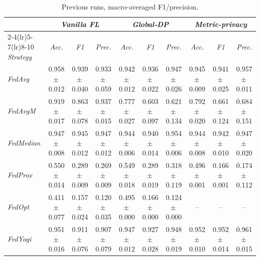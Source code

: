 \documentclass[11pt]{article}
\begin{document}
\begin{table}[h]
\centering
\caption{Previous runs, macro-averaged F1/precision.}
\begin{tabular}{l ccc ccc ccc}
\toprule
& \multicolumn{3}{c}{\emph{Vanilla FL}} & \multicolumn{3}{c}{\emph{Global-DP}} & \multicolumn{3}{c}{\emph{Metric-privacy}} \\
\cmidrule(lr){2-4}\cmidrule(lr){5-7}\cmidrule(lr){8-10}
\emph{Strategy} & \emph{Acc.} & \emph{F1} & \emph{Prec.} & \emph{Acc.} & \emph{F1} & \emph{Prec.} & \emph{Acc.} & \emph{F1} & \emph{Prec.} \\
\midrule
\emph{FedAvg} & 0.958 {\scriptsize$\pm$\,0.012} & 0.939 {\scriptsize$\pm$\,0.040} & 0.933 {\scriptsize$\pm$\,0.059} & 0.942 {\scriptsize$\pm$\,0.012} & 0.936 {\scriptsize$\pm$\,0.022} & 0.947 {\scriptsize$\pm$\,0.026} & 0.945 {\scriptsize$\pm$\,0.009} & 0.941 {\scriptsize$\pm$\,0.025} & 0.957 {\scriptsize$\pm$\,0.011} \\
\emph{FedAvgM} & 0.919 {\scriptsize$\pm$\,0.017} & 0.863 {\scriptsize$\pm$\,0.078} & 0.937 {\scriptsize$\pm$\,0.015} & 0.777 {\scriptsize$\pm$\,0.027} & 0.603 {\scriptsize$\pm$\,0.097} & 0.621 {\scriptsize$\pm$\,0.134} & 0.792 {\scriptsize$\pm$\,0.020} & 0.661 {\scriptsize$\pm$\,0.124} & 0.684 {\scriptsize$\pm$\,0.151} \\
\emph{FedMedian} & 0.947 {\scriptsize$\pm$\,0.008} & 0.945 {\scriptsize$\pm$\,0.012} & 0.947 {\scriptsize$\pm$\,0.012} & 0.944 {\scriptsize$\pm$\,0.006} & 0.940 {\scriptsize$\pm$\,0.014} & 0.954 {\scriptsize$\pm$\,0.006} & 0.944 {\scriptsize$\pm$\,0.008} & 0.942 {\scriptsize$\pm$\,0.010} & 0.947 {\scriptsize$\pm$\,0.020} \\
\emph{FedProx} & 0.550 {\scriptsize$\pm$\,0.014} & 0.289 {\scriptsize$\pm$\,0.009} & 0.269 {\scriptsize$\pm$\,0.009} & 0.549 {\scriptsize$\pm$\,0.018} & 0.289 {\scriptsize$\pm$\,0.019} & 0.318 {\scriptsize$\pm$\,0.119} & 0.496 {\scriptsize$\pm$\,0.001} & 0.166 {\scriptsize$\pm$\,0.001} & 0.174 {\scriptsize$\pm$\,0.112} \\
\emph{FedOpt} & 0.411 {\scriptsize$\pm$\,0.077} & 0.157 {\scriptsize$\pm$\,0.024} & 0.120 {\scriptsize$\pm$\,0.035} & 0.495 {\scriptsize$\pm$\,0.000} & 0.166 {\scriptsize$\pm$\,0.000} & 0.124 {\scriptsize$\pm$\,0.000} & -- & -- & -- \\
\emph{FedYogi} & 0.951 {\scriptsize$\pm$\,0.016} & 0.911 {\scriptsize$\pm$\,0.076} & 0.907 {\scriptsize$\pm$\,0.079} & 0.947 {\scriptsize$\pm$\,0.012} & 0.927 {\scriptsize$\pm$\,0.028} & 0.948 {\scriptsize$\pm$\,0.019} & 0.952 {\scriptsize$\pm$\,0.010} & 0.952 {\scriptsize$\pm$\,0.014} & 0.961 {\scriptsize$\pm$\,0.015} \\
\bottomrule
\end{tabular}
\end{table}
\end{document}
